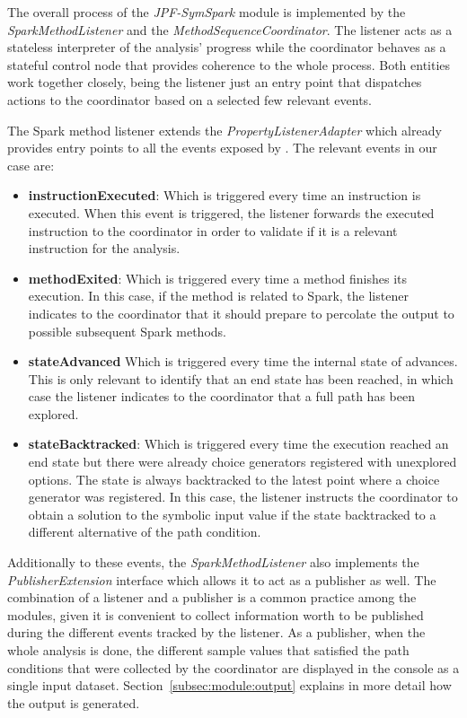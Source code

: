 
The overall process of the \textit{JPF-SymSpark} module is implemented by the \textit{SparkMethodListener} and the \textit{MethodSequenceCoordinator}. The listener acts as a stateless interpreter of the analysis' progress while the coordinator behaves as a stateful control node that provides coherence to the whole process. Both entities work together closely, being the listener just an entry point that dispatches actions to the coordinator based on a selected few relevant events.


The Spark method listener extends the \textit{PropertyListenerAdapter} which already provides entry points to all the events exposed by \jpf{}. The relevant events in our case are:

\begin{itemize}
	\item \textbf{instructionExecuted}: Which is triggered every time an instruction is executed. When this event is triggered, the listener forwards the executed instruction to the coordinator in order to validate if it is a relevant instruction for the analysis.
	\item \textbf{methodExited}: Which is triggered every time a method finishes its execution. In this case, if the method is related to Spark, the listener indicates to the coordinator that it should prepare to percolate the output to possible subsequent Spark methods.
	\item \textbf{stateAdvanced} Which is triggered every time the internal state of \jpf{} advances. This is only relevant to identify that an end state has been reached, in which case the listener indicates to the coordinator that a full path has been explored.
	\item \textbf{stateBacktracked}: Which is triggered every time the execution reached an end state but there were already choice generators registered with unexplored options. The state is always backtracked to the latest point where a choice generator was registered. In this case, the listener instructs the coordinator to obtain a solution to the symbolic input value if the state backtracked to a different alternative of the path condition.
\end{itemize}

Additionally to these events, the \textit{SparkMethodListener} also implements the \textit{PublisherExtension} interface which allows it to act as a publisher as well. The combination of a listener and a publisher is a common practice among the \jpf{} modules, given it is convenient to collect information worth to be published during the different events tracked by the listener. As a publisher, when the whole analysis is done, the different sample values that satisfied the path conditions that were collected by the coordinator are displayed in the console as a single input dataset. Section~\ref{subsec:module:output} explains in more detail how the output is generated.

